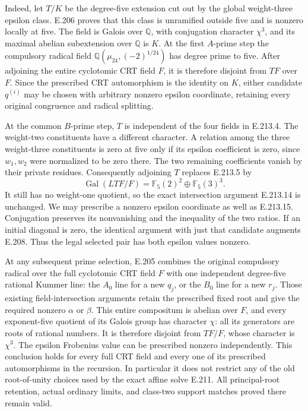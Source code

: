 Indeed, let $T/K$ be the degree-five extension cut out by
the global weight-three epsilon class. E.206 proves that
this class is unramified outside five and is nonzero
locally at five. The field is Galois over $\mathbb Q$,
with conjugation character $\chi^3$, and its maximal
abelian subextension over $\mathbb Q$ is $K$.
At the first $A$-prime step the compulsory radical field
$\mathbb Q(\mu_{24},(-2)^{1/24})$ has degree prime to
five. After adjoining the entire cyclotomic CRT field
$F$, it is therefore disjoint from $TF$ over $F$.
Since the prescribed CRT automorphism is the identity
on $K$, either candidate $q^{(i)}$ may be chosen with
arbitrary nonzero epsilon coordinate, retaining every
original congruence and radical splitting.

At the common $B$-prime step, $T$ is independent of
the four fields in E.213.4. The weight-two constituents
have a different character. A relation among the three
weight-three constituents is zero at five only if its
epsilon coefficient is zero, since $w_1,w_2$ were
normalized to be zero there. The two remaining
coefficients vanish by their private residues.
Consequently adjoining $T$ replaces E.213.5 by
\[
 \operatorname{Gal}(LTF/F)
   =\mathbb F_5(2)^2\oplus\mathbb F_5(3)^3.
 \tag{E.213.20}
\]
It still has no weight-one quotient, so the exact
intersection argument E.213.14 is unchanged. We may
prescribe a nonzero epsilon coordinate as well as
E.213.15. Conjugation preserves its nonvanishing and
the inequality of the two ratios. If an initial
diagonal is zero, the identical argument with just
that candidate augments E.208. Thus the legal
selected pair has both epsilon values nonzero.

At any subsequent prime selection, E.205 combines
the original compulsory radical over the full
cyclotomic CRT field $F$ with one independent
degree-five rational Kummer line: the $A_0$ line
for a new $q_j$, or the $B_0$ line for a new $r_j$.
Those existing field-intersection arguments retain
the prescribed fixed root and give the required
nonzero $\alpha$ or $\beta$. This entire compositum
is abelian over $F$, and every exponent-five
quotient of its Galois group has character $\chi$:
all its generators are roots of rational numbers.
It is therefore disjoint from $TF/F$, whose
character is $\chi^3$. The epsilon Frobenius value
can be prescribed nonzero independently.
This conclusion holds for every full CRT field
and every one of its prescribed automorphisms
in the recursion. In particular it does not
restrict any of the old root-of-unity choices
used by the exact affine solve E.211. All
principal-root retention, actual ordinary
limits, and class-two support matches proved
there remain valid.

